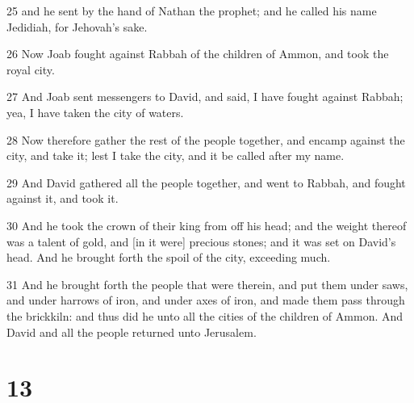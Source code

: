 \par 25 and he sent by the hand of Nathan the prophet; and he called his name Jedidiah, for Jehovah's sake.
\par 26 Now Joab fought against Rabbah of the children of Ammon, and took the royal city.
\par 27 And Joab sent messengers to David, and said, I have fought against Rabbah; yea, I have taken the city of waters.
\par 28 Now therefore gather the rest of the people together, and encamp against the city, and take it; lest I take the city, and it be called after my name.
\par 29 And David gathered all the people together, and went to Rabbah, and fought against it, and took it.
\par 30 And he took the crown of their king from off his head; and the weight thereof was a talent of gold, and [in it were] precious stones; and it was set on David's head. And he brought forth the spoil of the city, exceeding much.
\par 31 And he brought forth the people that were therein, and put them under saws, and under harrows of iron, and under axes of iron, and made them pass through the brickkiln: and thus did he unto all the cities of the children of Ammon. And David and all the people returned unto Jerusalem.

\chapter{13}

